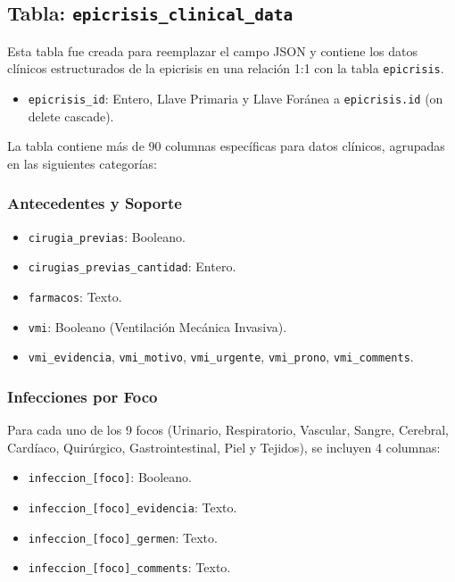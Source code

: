 \documentclass{article}
\begin{document}
\subsection{Tabla: \texttt{epicrisis\_clinical\_data}}
Esta tabla fue creada para reemplazar el campo JSON y contiene los datos clínicos estructurados de la epicrisis en una relación 1:1 con la tabla \texttt{epicrisis}.

\begin{itemize}
    \item \texttt{epicrisis\_id}: Entero, Llave Primaria y Llave Foránea a \texttt{epicrisis.id} (on delete cascade).
\end{itemize}

La tabla contiene más de 90 columnas específicas para datos clínicos, agrupadas en las siguientes categorías:

\subsubsection{Antecedentes y Soporte}
\begin{itemize}
    \item \texttt{cirugia\_previas}: Booleano.
    \item \texttt{cirugias\_previas\_cantidad}: Entero.
    \item \texttt{farmacos}: Texto.
    \item \texttt{vmi}: Booleano (Ventilación Mecánica Invasiva).
    \item \texttt{vmi\_evidencia}, \texttt{vmi\_motivo}, \texttt{vmi\_urgente}, \texttt{vmi\_prono}, \texttt{vmi\_comments}.
\end{itemize}

\subsubsection{Infecciones por Foco}
Para cada uno de los 9 focos (Urinario, Respiratorio, Vascular, Sangre, Cerebral, Cardíaco, Quirúrgico, Gastrointestinal, Piel y Tejidos), se incluyen 4 columnas:
\begin{itemize}
    \item \texttt{infeccion\_[foco]}: Booleano.
    \item \texttt{infeccion\_[foco]\_evidencia}: Texto.
    \item \texttt{infeccion\_[foco]\_germen}: Texto.
    \item \texttt{infeccion\_[foco]\_comments}: Texto.
\end{itemize}
\end{document}
